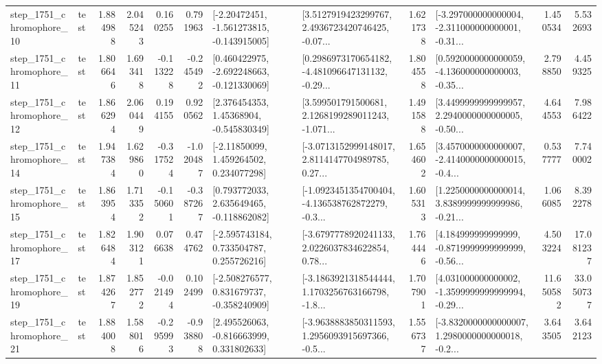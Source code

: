 \begin{tabular}{llrrrrllrlrr}
 step\_1751\_chromophore\_10 &      test &      1.884988 &    2.045243 &      0.160255 &  0.791963 &   [-2.20472451, -1.561273815, -0.143915005] &  [3.5127919423299767, 2.4936723420746425, -0.07... &       1.621738 &  [-3.297000000000004, -2.311000000000001, -0.31... &            1.450534 &          5.532693 \\
 step\_1751\_chromophore\_11 &      test &      1.806646 &    1.693418 &     -0.113228 & -0.245492 &   [0.460422975, -2.692248663, -0.121330069] &  [0.2986973170654182, -4.481096647131132, -0.29... &       1.804558 &  [0.5920000000000059, -4.136000000000003, -0.35... &            2.798850 &          4.459325 \\
 step\_1751\_chromophore\_12 &      test &      1.866294 &    2.060449 &      0.194155 &  0.920562 &     [2.376454353, 1.45368904, -0.545830349] &  [3.599501791500681, 2.1268199289011243, -1.071... &       1.491588 &  [3.4499999999999957, 2.2940000000000005, -0.50... &            4.644553 &          7.986422 \\
 step\_1751\_chromophore\_14 &      test &      1.947384 &    1.629860 &     -0.317524 & -1.020487 &     [-2.11850099, 1.459264502, 0.234077298] &  [-3.0713152999148017, 2.8114147704989785, 0.27... &       1.654602 &  [3.4570000000000007, -2.4140000000000015, -0.4... &            0.537777 &          7.740002 \\
 step\_1751\_chromophore\_15 &      test &      1.863954 &    1.713352 &     -0.150601 & -0.387267 &    [0.793772033, 2.635649465, -0.118862082] &  [-1.0923451354700404, -4.136538762872279, -0.3... &       1.605313 &  [1.2250000000000014, 3.8389999999999986, -0.21... &            1.066085 &          8.392278 \\
 step\_1751\_chromophore\_17 &      test &      1.826484 &    1.903121 &      0.076638 &  0.474762 &    [-2.595743184, 0.733504787, 0.255726216] &  [-3.6797778920241133, 2.0226037834622854, 0.78... &       1.764446 &  [4.184999999999999, -0.8719999999999999, -0.56... &            4.503224 &         17.081237 \\
 step\_1751\_chromophore\_19 &      test &      1.874267 &    1.852772 &     -0.021494 &  0.102499 &   [-2.508276577, 0.831679737, -0.358240909] &  [-3.1863921318544444, 1.1703256763166798, -1.8... &       1.707901 &  [4.031000000000002, -1.3599999999999994, -0.29... &           11.650582 &         33.050737 \\
 step\_1751\_chromophore\_21 &      test &      1.884008 &    1.588016 &     -0.295993 & -0.938808 &    [2.495526063, -0.816663999, 0.331802633] &  [-3.9638883850311593, 1.2956093915697366, -0.5... &       1.556737 &  [-3.8320000000000007, 1.2980000000000018, -0.2... &            3.643505 &          3.642123 \\

\end{tabular}
